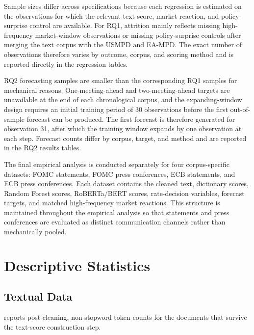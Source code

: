 Sample sizes differ across specifications because each regression is
estimated on the observations for which the relevant text score, market
reaction, and policy-surprise control are available. For RQ1, attrition
mainly reflects missing high-frequency market-window observations or
missing policy-surprise controls after merging the text corpus with the
USMPD and EA-MPD. The exact number of observations therefore varies by
outcome, corpus, and scoring method and is reported directly in the
regression tables.

RQ2 forecasting samples are smaller than the corresponding RQ1 samples
for mechanical reasons. One-meeting-ahead and two-meeting-ahead targets
are unavailable at the end of each chronological corpus, and the
expanding-window design requires an initial training period of
30 observations before the first out-of-sample forecast can be produced.
The first forecast is therefore generated for observation 31, after which
the training window expands by one observation at each step. Forecast
counts differ by corpus, target, and method and are reported in the RQ2
results tables.

The final empirical analysis is conducted separately for four
corpus-specific datasets: FOMC statements, FOMC press conferences, ECB
statements, and ECB press conferences. Each dataset contains the cleaned
text, dictionary scores, Random Forest scores, RoBERTa/BERT scores,
rate-decision variables, forecast targets, and matched high-frequency
market reactions. This structure is maintained throughout the empirical
analysis so that statements and press conferences are evaluated as
distinct communication channels rather than mechanically pooled.

\section{Descriptive Statistics}
\label{sec:data_descriptives}

\subsection{Textual Data}
\label{sec:data_desc_text}

 reports post-cleaning, non-stopword token counts for the documents
that survive the text-score construction step.

